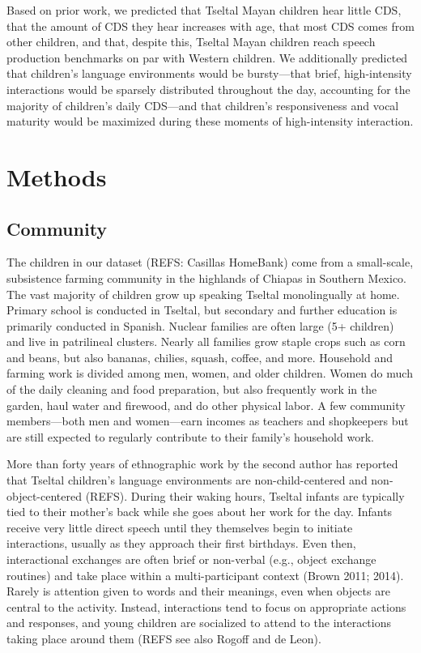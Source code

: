 \documentclass[floatsintext,man]{apa6}
\theoremstyle{definition}
\theoremstyle{definition}
\theoremstyle{definition}
\theoremstyle{remark}
\begin{document}
Based on prior work, we predicted that Tseltal Mayan children hear
little CDS, that the amount of CDS they hear increases with age, that
most CDS comes from other children, and that, despite this, Tseltal
Mayan children reach speech production benchmarks on par with Western
children. We additionally predicted that children's language
environments would be bursty---that brief, high-intensity interactions
would be sparsely distributed throughout the day, accounting for the
majority of children's daily CDS---and that children's responsiveness
and vocal maturity would be maximized during these moments of
high-intensity interaction.

\hypertarget{methods}{\section{Methods}\label{methods}}

\subsection{Community}\label{methods-community}

The children in our dataset (REFS: Casillas HomeBank) come from a
small-scale, subsistence farming community in the highlands of Chiapas
in Southern Mexico. The vast majority of children grow up speaking
Tseltal monolingually at home. Primary school is conducted in Tseltal,
but secondary and further education is primarily conducted in Spanish.
Nuclear families are often large (5+ children) and live in patrilineal
clusters. Nearly all families grow staple crops such as corn and beans,
but also bananas, chilies, squash, coffee, and more. Household and
farming work is divided among men, women, and older children. Women do
much of the daily cleaning and food preparation, but also frequently
work in the garden, haul water and firewood, and do other physical
labor. A few community members---both men and women---earn incomes as
teachers and shopkeepers but are still expected to regularly contribute
to their family's household work.

More than forty years of ethnographic work by the second author has
reported that Tseltal children's language environments are
non-child-centered and non-object-centered (REFS). During their waking
hours, Tseltal infants are typically tied to their mother's back while
she goes about her work for the day. Infants receive very little direct
speech until they themselves begin to initiate interactions, usually as
they approach their first birthdays. Even then, interactional exchanges
are often brief or non-verbal (e.g., object exchange routines) and take
place within a multi-participant context (Brown 2011; 2014). Rarely is
attention given to words and their meanings, even when objects are
central to the activity. Instead, interactions tend to focus on
appropriate actions and responses, and young children are socialized to
attend to the interactions taking place around them (REFS see also
Rogoff and de Leon).
\end{document}
